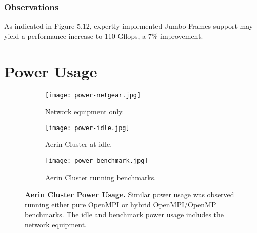 \subsubsection{Observations}

As indicated in Figure 5.12, expertly implemented Jumbo Frames support may yield a performance increase to 110 Gflops, a 7\% improvement.




%
%
\section{Power Usage}

\begin{figure}[]
	\begin{subfigure}{1.0\textwidth}
		\centering
		\texttt{[image: power-netgear.jpg]}
		\caption{Network equipment only.}
		\label{fig:subim1}
	\end{subfigure}
	\par\bigskip
	\begin{subfigure}{1.0\textwidth}
		\centering
		\texttt{[image: power-idle.jpg]}
		\caption{Aerin Cluster at idle.}
		\label{fig:subim2}
	\end{subfigure}
	\par\bigskip
	\begin{subfigure}{1.0\textwidth}
		\centering
		\texttt{[image: power-benchmark.jpg]}
		\caption{Aerin Cluster running benchmarks.}
		\label{fig:subim2}
	\end{subfigure}
\caption{\textbf{Aerin Cluster Power Usage.} Similar power usage was observed running either pure OpenMPI or hybrid OpenMPI/OpenMP benchmarks. The idle and benchmark power usage includes the network equipment.}
\label{fig:image2}
\end{figure}






